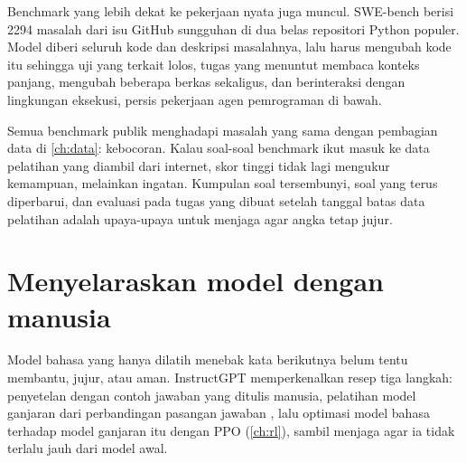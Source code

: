 Benchmark yang lebih dekat ke pekerjaan nyata juga muncul. SWE-bench \citep{jimenez2023} berisi 2294 masalah dari isu GitHub sungguhan di
dua belas repositori Python populer. Model diberi seluruh kode dan deskripsi masalahnya, lalu harus mengubah kode itu sehingga uji yang
terkait lolos, tugas yang menuntut membaca konteks panjang, mengubah beberapa berkas sekaligus, dan berinteraksi dengan lingkungan
eksekusi, persis pekerjaan agen pemrograman di bawah.

Semua benchmark publik menghadapi masalah yang sama dengan pembagian data di \cref{ch:data}: kebocoran. Kalau soal-soal benchmark
ikut masuk ke data pelatihan yang diambil dari internet, skor tinggi tidak lagi mengukur kemampuan, melainkan ingatan. Kumpulan soal
tersembunyi, soal yang terus diperbarui, dan evaluasi pada tugas yang dibuat setelah tanggal batas data pelatihan adalah upaya-upaya
untuk menjaga agar angka tetap jujur.

\section{Menyelaraskan model dengan manusia}

Model bahasa yang hanya dilatih menebak kata berikutnya belum tentu membantu, jujur, atau aman.
InstructGPT \citep{ouyang2022} memperkenalkan resep tiga langkah: penyetelan dengan contoh jawaban yang
ditulis manusia, pelatihan model ganjaran dari perbandingan pasangan jawaban \citep{christiano2017}, lalu
optimasi model bahasa terhadap model ganjaran itu dengan PPO (\cref{ch:rl}), sambil menjaga agar ia tidak
terlalu jauh dari model awal.

